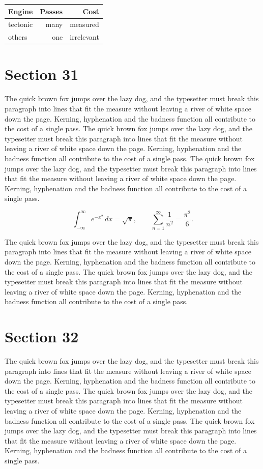 \documentclass{article}
\begin{document}
\begin{center}
\begin{tabular}{lrr}
\toprule
Engine & Passes & Cost \\
\midrule
tectonic & many & measured \\
others & one & irrelevant \\
\bottomrule
\end{tabular}
\end{center}

\section{Section 31}
The quick brown fox jumps over the lazy dog, and the typesetter must break this paragraph into lines that fit the measure without leaving a river of white space down the page. Kerning, hyphenation and the badness function all contribute to the cost of a single pass. The quick brown fox jumps over the lazy dog, and the typesetter must break this paragraph into lines that fit the measure without leaving a river of white space down the page. Kerning, hyphenation and the badness function all contribute to the cost of a single pass. The quick brown fox jumps over the lazy dog, and the typesetter must break this paragraph into lines that fit the measure without leaving a river of white space down the page. Kerning, hyphenation and the badness function all contribute to the cost of a single pass. 

\begin{equation}
\int_{-\infty}^{\infty} e^{-x^{2}}\,dx = \sqrt{\pi}, \qquad
\sum_{n=1}^{\infty} \frac{1}{n^{2}} = \frac{\pi^{2}}{6}.
\end{equation}

The quick brown fox jumps over the lazy dog, and the typesetter must break this paragraph into lines that fit the measure without leaving a river of white space down the page. Kerning, hyphenation and the badness function all contribute to the cost of a single pass. The quick brown fox jumps over the lazy dog, and the typesetter must break this paragraph into lines that fit the measure without leaving a river of white space down the page. Kerning, hyphenation and the badness function all contribute to the cost of a single pass. 
\section{Section 32}
The quick brown fox jumps over the lazy dog, and the typesetter must break this paragraph into lines that fit the measure without leaving a river of white space down the page. Kerning, hyphenation and the badness function all contribute to the cost of a single pass. The quick brown fox jumps over the lazy dog, and the typesetter must break this paragraph into lines that fit the measure without leaving a river of white space down the page. Kerning, hyphenation and the badness function all contribute to the cost of a single pass. The quick brown fox jumps over the lazy dog, and the typesetter must break this paragraph into lines that fit the measure without leaving a river of white space down the page. Kerning, hyphenation and the badness function all contribute to the cost of a single pass. 
\end{document}
